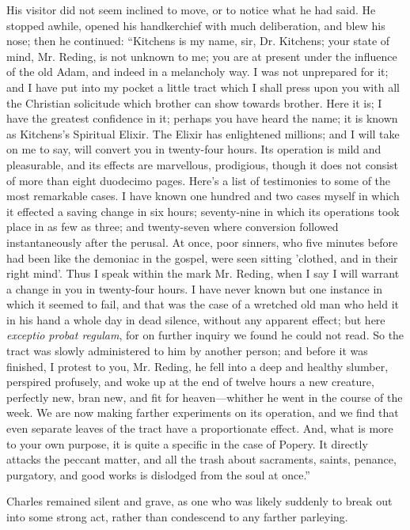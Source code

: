 His visitor did not seem inclined to move, or to notice what he had
said. He stopped awhile, opened his handkerchief with much
deliberation, and blew his nose; then he continued: ``Kitchens is
my name, sir, Dr. Kitchens; your state of mind, Mr. Reding, is not
unknown to me; you are at present under the influence of the old Adam,
and indeed in a melancholy way. I was not unprepared for it; and I
have put into my pocket a little tract which I shall press upon you
with all the Christian solicitude which brother can show towards
brother. Here it is; I have the greatest confidence in it; perhaps you
have heard the name; it is known as Kitchens's Spiritual Elixir. The
Elixir has enlightened millions; and I will take on me to say, will
convert you in twenty-four hours. Its operation is mild and
pleasurable, and its effects are marvellous, prodigious, though it
does not consist of more than eight duodecimo pages. Here's a list of
testimonies to some of the most remarkable cases. I have known one
hundred and two cases myself in which it effected a saving change in
six hours; seventy-nine in which its operations took place in as few
as three; and twenty-seven where conversion followed instantaneously
after the perusal. At once, poor sinners, who five minutes before had
been like the demoniac in the gospel, were seen sitting 'clothed, and
in their right mind'. Thus I speak within the mark Mr. Reding, when I
say I will warrant a change in you in twenty-four hours. I have never
known but one instance in which it seemed to fail, and that was the
case of a wretched old man who held it in his hand a whole day in dead
silence, without any apparent effect; but here \emph{exceptio
probat regulam}, for on further inquiry we found he could not read.
So the tract was slowly administered to him by another person; and
before it was finished, I protest to you, Mr. Reding, he fell into a
deep and healthy slumber, perspired profusely, and woke up at the end
of twelve hours a new creature, perfectly new, bran new, and fit for
heaven—whither he went in the course of the week. We are now making
farther experiments on its operation, and we find that even separate
leaves of the tract have a proportionate effect. And, what is more to
your own purpose, it is quite a specific in the case of Popery. It
directly attacks the peccant matter, and all the trash about
sacraments, saints, penance, purgatory, and good works is dislodged
from the soul at once.''

Charles remained silent and grave, as one who was likely suddenly
to break out into some strong act, rather than condescend to any
farther parleying.

